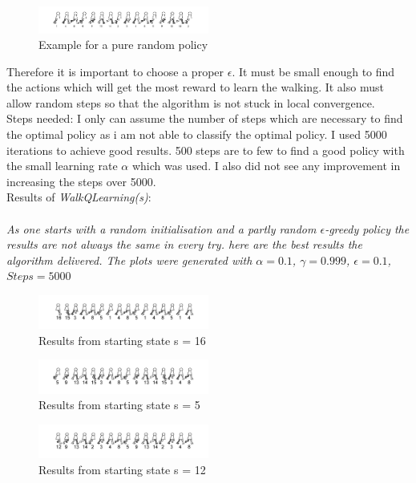 \documentclass[conference]{IEEEtran}
\begin{document}
\begin{itemize}
\begin{figure}[h!]
  	\centering
    \includegraphics[width=0.5\textwidth]{img/pure_random.png}
    \caption{Example for a pure random policy}
    \label{fig:greedy}
\end{figure}
Therefore it is important to choose a proper $\epsilon$. It must be small enough to find the actions which will get the most reward to learn the walking. It also must allow random steps so that the algorithm is not stuck in local convergence.\\

Steps needed: I only can assume the number of steps which are necessary to find the optimal policy as i am not able to classify the optimal policy. I used 5000 iterations to achieve good results. 500 steps are to few to find a good policy with the small learning rate $\alpha$ which was used. I also did not see any improvement in increasing the steps over 5000. \\


Results of \textit{WalkQLearning(s)}: 
\\
\\
\textit{As one starts with a random initialisation and a partly random $\epsilon$-greedy policy the results are not always the same in every try. here are the best results the algorithm delivered. The plots were generated with $\alpha=0.1$, $\gamma=0.999$, $\epsilon=0.1$, $Steps=5000$}

\begin{figure}[h!]
  	\centering
    \includegraphics[width=0.5\textwidth]{img/3walkshow16.png}
    \caption{Results from starting state s = 16}
    \label{fig:3walkshow16}
\end{figure}

\begin{figure}[h!]
  	\centering
    \includegraphics[width=0.5\textwidth]{img/3walkshow5.png}
    \caption{Results from starting state s = 5}
    \label{fig:3walkshow5}
\end{figure}

\begin{figure}[h!]
  	\centering
    \includegraphics[width=0.5\textwidth]{img/3walkshow12.png}
    \caption{Results from starting state s = 12}
    \label{fig:3walkshow12}
\end{figure}


\end{itemize}
\end{document}
